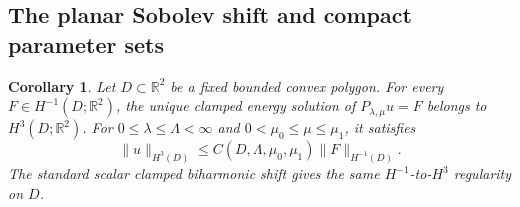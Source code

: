 \documentclass[11pt,a4paper]{article}
\newtheorem{corollary}[theorem]{Corollary}
\theoremstyle{remark}
\numberwithin{equation}{section}
\begin{document}
\subsection{The planar Sobolev shift and compact parameter sets}

\begin{corollary}\label{cor:planar-H320}
Let $D\subset\mathbb R^2$ be a fixed bounded convex polygon. For every
$F\in H^{-1}(D;\mathbb R^2)$, the unique clamped energy solution of
$P_{\lambda,\mu}u=F$ belongs to $H^3(D;\mathbb R^2)$.
For $0\le\lambda\le\Lambda<\infty$ and
$0<\mu_0\le\mu\le\mu_1$, it satisfies
\[
 \|u\|_{H^3(D)}
 \le C(D,\Lambda,\mu_0,\mu_1)\|F\|_{H^{-1}(D)}.
\]
The standard scalar clamped biharmonic shift
\cite{BacutaBramblePasciak2002} gives the same
$H^{-1}$-to-$H^3$ regularity on $D$.
\end{corollary}
\end{document}
